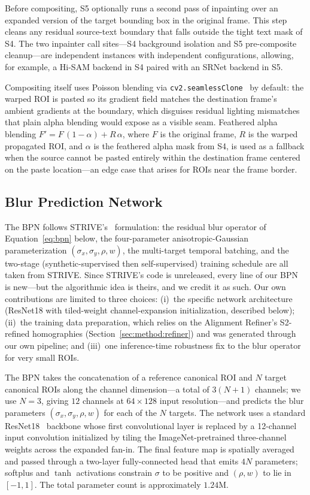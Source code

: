 Before compositing, S5 optionally runs a second pass of inpainting
over an expanded version of the target bounding box in the
original frame. This step cleans any residual source-text boundary
that falls outside the tight text mask of S4. The two inpainter
call sites---S4 background isolation and S5 pre-composite
cleanup---are independent instances with independent
configurations, allowing, for example, a Hi-SAM backend in S4
paired with an SRNet backend in S5.

Compositing itself uses Poisson blending via
\texttt{cv2.seamlessClone}~\citep{perez2003poisson} by default:
the warped ROI is pasted so its gradient field matches the
destination frame's ambient gradients at the boundary, which
disguises residual lighting mismatches that plain alpha blending
would expose as a visible seam. Feathered alpha blending
$F' = F\,(1-\alpha) + R\,\alpha$, where $F$ is the original frame,
$R$ is the warped propagated ROI, and $\alpha$ is the feathered
alpha mask from S4, is used as a fallback when the source cannot
be pasted entirely within the destination frame centered on the
paste location---an edge case that arises for ROIs near the frame
border.

\subsection{Blur Prediction Network}
\label{sec:method:bpn}

The BPN follows STRIVE's~\citep{subramanian2021strive} formulation:
the residual blur operator of Equation~\ref{eq:bpn} below, the
four-parameter anisotropic-Gaussian parameterization
$(\sigma_x, \sigma_y, \rho, w)$, the multi-target temporal batching,
and the two-stage (synthetic-supervised then self-supervised)
training schedule are all taken from STRIVE. Since STRIVE's code is
unreleased, every line of our BPN is new---but the algorithmic idea
is theirs, and we credit it as such. Our own contributions are
limited to three choices: (i)~the specific network architecture
(ResNet18 with tiled-weight channel-expansion initialization,
described below); (ii)~the training data preparation, which relies
on the Alignment Refiner's S2-refined homographies
(Section~\ref{sec:method:refiner}) and was generated through our
own pipeline; and (iii)~one inference-time robustness fix to the
blur operator for very small ROIs.

The BPN takes the concatenation of a reference canonical ROI and
$N$ target canonical ROIs along the channel dimension---a total of
$3(N+1)$ channels; we use $N=3$, giving $12$ channels at
$64\times 128$ input resolution---and predicts the blur parameters
$(\sigma_x, \sigma_y, \rho, w)$ for each of the $N$ targets. The
network uses a standard ResNet18~\citep{he2016resnet} backbone
whose first convolutional layer is replaced by a 12-channel input
convolution initialized by tiling the ImageNet-pretrained
three-channel weights across the expanded fan-in. The final
feature map is spatially averaged and passed through a two-layer
fully-connected head that emits $4N$ parameters; softplus and
$\tanh$ activations constrain $\sigma$ to be positive and
$(\rho, w)$ to lie in~$[-1, 1]$. The total parameter count is
approximately $1.24$M.

